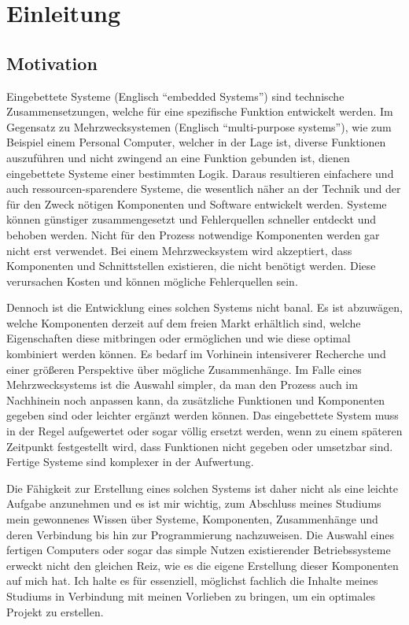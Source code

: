 \hypertarget{einleitung}{%
\chapter{Einleitung}\label{einleitung}}

\hypertarget{motivation}{%
\section{Motivation}\label{motivation}}

Eingebettete Systeme (Englisch ``embedded Systems'') sind technische
Zusammensetzungen, welche für eine spezifische Funktion entwickelt
werden. Im Gegensatz zu Mehrzwecksystemen (Englisch ``multi-purpose
systems''), wie zum Beispiel einem Personal Computer, welcher in der
Lage ist, diverse Funktionen auszuführen und nicht zwingend an eine
Funktion gebunden ist, dienen eingebettete Systeme einer bestimmten
Logik. Daraus resultieren einfachere und auch ressourcen-sparendere
Systeme, die wesentlich näher an der Technik und der für den Zweck
nötigen Komponenten und Software entwickelt werden. Systeme können
günstiger zusammengesetzt und Fehlerquellen schneller entdeckt und
behoben werden. Nicht für den Prozess notwendige Komponenten werden gar
nicht erst verwendet. Bei einem Mehrzwecksystem wird akzeptiert, dass
Komponenten und Schnittstellen existieren, die nicht benötigt werden.
Diese verursachen Kosten und können mögliche Fehlerquellen sein.

Dennoch ist die Entwicklung eines solchen Systems nicht banal. Es ist
abzuwägen, welche Komponenten derzeit auf dem freien Markt erhältlich
sind, welche Eigenschaften diese mitbringen oder ermöglichen und wie
diese optimal kombiniert werden können. Es bedarf im Vorhinein
intensiverer Recherche und einer größeren Perspektive über mögliche
Zusammenhänge. Im Falle eines Mehrzwecksystems ist die Auswahl simpler,
da man den Prozess auch im Nachhinein noch anpassen kann, da zusätzliche
Funktionen und Komponenten gegeben sind oder leichter ergänzt werden
können. Das eingebettete System muss in der Regel aufgewertet oder sogar
völlig ersetzt werden, wenn zu einem späteren Zeitpunkt festgestellt
wird, dass Funktionen nicht gegeben oder umsetzbar sind. Fertige Systeme
sind komplexer in der Aufwertung.

Die Fähigkeit zur Erstellung eines solchen Systems ist daher nicht als
eine leichte Aufgabe anzunehmen und es ist mir wichtig, zum Abschluss
meines Studiums mein gewonnenes Wissen über Systeme, Komponenten,
Zusammenhänge und deren Verbindung bis hin zur Programmierung
nachzuweisen. Die Auswahl eines fertigen Computers oder sogar das simple
Nutzen existierender Betriebssysteme erweckt nicht den gleichen Reiz,
wie es die eigene Erstellung dieser Komponenten auf mich hat. Ich halte
es für essenziell, möglichst fachlich die Inhalte meines Studiums in
Verbindung mit meinen Vorlieben zu bringen, um ein optimales Projekt zu
erstellen.

